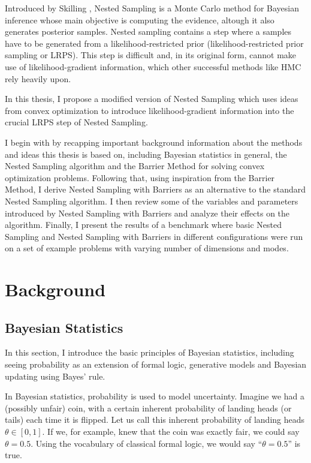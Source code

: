 \documentclass[12pt, a4paper]{report}
\begin{document}
Introduced by Skilling \cite{skilling}, Nested Sampling is a Monte Carlo method for Bayesian inference whose main objective is computing the evidence, altough it also generates posterior samples.
Nested sampling contains a step where a samples have to be generated from a likelihood-restricted prior (likelihood-restricted prior sampling or LRPS).
This step is difficult \cite[9]{hmc_in_ns} and, in its original form, cannot make use of likelihood-gradient information, which other successful methods like HMC rely heavily upon.

In this thesis, I propose a modified version of Nested Sampling which uses ideas from convex optimization to introduce likelihood-gradient information into the crucial LRPS step of Nested Sampling.

I begin with by recapping important background information about the methods and ideas this thesis is based on, including Bayesian statistics in general, the Nested Sampling algorithm and the Barrier Method for solving convex optimization problems.
Following that, using inspiration from the Barrier Method, I derive Nested Sampling with Barriers as an alternative to the standard Nested Sampling algorithm.
I then review some of the variables and parameters introduced by Nested Sampling with Barriers and analyze their effects on the algorithm.
Finally, I present the results of a benchmark where basic Nested Sampling and Nested Sampling with Barriers in different configurations were run on a set of example problems with varying number of dimensions and modes.
\setcounter{page}{5}

\chapter{Background}
\section{Bayesian Statistics}
In this section, I introduce the basic principles of Bayesian statistics, including seeing probability as an extension of formal logic, generative models and Bayesian updating using Bayes' rule.

In Bayesian statistics, probability is used to model uncertainty.
Imagine we had a (possibly unfair) coin, with a certain inherent probability of landing heads (or tails) each time it is flipped.
Let us call this inherent probability of landing heads $\theta \in [0, 1]$.
If we, for example, knew that the coin was exactly fair, we could say $\theta = 0.5$.
Using the vocabulary of classical formal logic, we would say ``$\theta = 0.5$'' is true.
\end{document}
